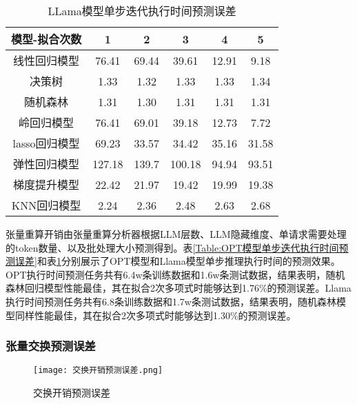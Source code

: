 \begin{table}[H]
  \centering
  \caption{LLama模型单步迭代执行时间预测误差}
  \label{Table:LLama模型单步迭代执行时间预测误差}
  \renewcommand{\arraystretch}{1.3}
  \small
  \begin{tabular}{c c c c c c}
    \toprule
    \textbf{模型-拟合次数} & \textbf{1} & \textbf{2} & \textbf{3} & \textbf{4} & \textbf{5} \\
    \midrule
    线性回归模型 & 76.41 & 69.44 & 39.61 & 12.91 & 9.18 \\ 
    决策树 & 1.33 & 1.32 & 1.33 & 1.33 & 1.34 \\ 
    随机森林 & 1.31 & 1.30 & 1.31 & 1.31 & 1.31 \\ 
    岭回归模型 & 76.41 & 69.01 & 39.18 & 12.73 & 7.72 \\ 
    lasso回归模型 & 69.23 & 33.57 & 34.42 & 35.16 & 31.58  \\ 
    弹性回归模型 & 127.18 & 139.7 & 100.18 & 94.94 & 93.51  \\ 
    梯度提升模型 & 22.42 & 21.97 & 19.42 & 19.99 & 19.38  \\ 
    KNN回归模型 & 2.24 & 2.36 & 2.48 & 2.63 & 2.68 \\ 
    \bottomrule
  \end{tabular}
\end{table}

张量重算开销由张量重算分析器根据LLM层数、LLM隐藏维度、单请求需要处理的token数量、以及批处理大小预测得到。表\ref{Table:OPT模型单步迭代执行时间预测误差}和表\ref{Table:LLama模型单步迭代执行时间预测误差}分别展示了OPT模型和Llama模型单步推理执行时间的预测效果。OPT执行时间预测任务共有6.4w条训练数据和1.6w条测试数据，结果表明，随机森林回归模型性能最佳，其在拟合2次多项式时能够达到1.76\%的预测误差。Llama执行时间预测任务共有6.8条训练数据和1.7w条测试数据，结果表明，随机森林模型同样性能最佳，其在拟合2次多项式时能够达到1.30\%的预测误差。


\subsubsection{张量交换预测误差}

\begin{figure}[!htbp]
  \centering
  \texttt{[image: 交换开销预测误差.png]}
  \caption{交换开销预测误差}
  \label{Fig:交换开销预测误差}
\end{figure}

